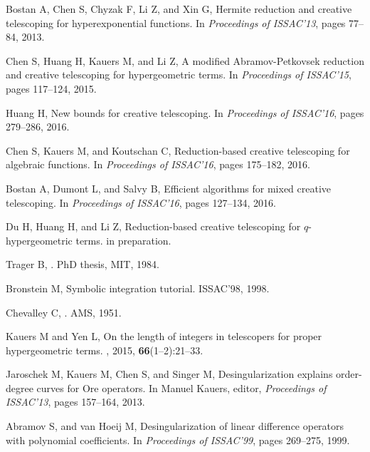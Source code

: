 \documentclass{jssc}
\begin{document}
\begin{thebibliography}{100}
Bostan A, Chen S, Chyzak F, Li Z, and Xin G,
\newblock Hermite reduction and creative telescoping for hyperexponential
  functions.
\newblock In {\it Proceedings of ISSAC'13}, pages 77--84, 2013.

Chen S, Huang H, Kauers M, and Li Z,
\newblock A modified {A}bramov-{P}etkovsek reduction and creative telescoping
  for hypergeometric terms.
\newblock In {\it Proceedings of ISSAC'15}, pages 117--124, 2015.

Huang H,
\newblock New bounds for creative telescoping.
\newblock In {\it Proceedings of ISSAC'16}, pages 279--286, 2016.

Chen S, Kauers M, and  Koutschan C,
\newblock Reduction-based creative telescoping for algebraic functions.
\newblock In {\it Proceedings of ISSAC'16}, pages 175--182, 2016.

Bostan A, Dumont L, and Salvy B,
\newblock Efficient algorithms for mixed creative telescoping.
\newblock In {\it Proceedings of ISSAC'16}, pages 127--134, 2016.

Du H, Huang H, and Li Z,
\newblock Reduction-based creative telescoping for $q$-hypergeometric terms.
\newblock in preparation.

Trager B,
.
\newblock PhD thesis, MIT, 1984.

Bronstein M,
\newblock Symbolic integration tutorial.
\newblock ISSAC'98, 1998.

Chevalley C,
.
\newblock AMS, 1951.

Kauers M and Yen L,
\newblock On the length of integers in telescopers for proper hypergeometric
  terms.
,  2015, {\bf 66}(1--2):21--33.

Jaroschek M, Kauers M,  Chen S, and  Singer M,
\newblock Desingularization explains order-degree curves for {Ore} operators.
\newblock In Manuel Kauers, editor, {\it Proceedings of ISSAC'13}, pages
  157--164, 2013.

 Abramov S, and van Hoeij M,
\newblock Desingularization of linear difference operators with polynomial
  coefficients.
\newblock In {\it Proceedings of ISSAC'99}, pages 269--275, 1999.


\end{thebibliography}
\end{document}
